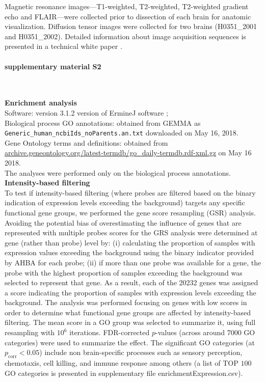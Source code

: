 \documentclass[10pt,A4]{article}
\begin{document}
Magnetic resonance images---T1-weighted, T2-weighted, T2-weighted gradient echo and FLAIR---were collected prior to dissection of each brain for anatomic visualization. Diffusion tensor images were collected for two brains (H0351\_2001 and H0351\_2002). Detailed information about image acquisition sequences is presented in a technical white paper \citep{AHBAdoc}.

\paragraph*{supplementary material S2}\mbox{}\\
\label{SItext2}

\textbf{Enrichment analysis} \\
\noindent Software: version 3.1.2 version of ErmineJ software \citep{Gillis2010};\\
Biological process GO annotations: obtained from GEMMA \citep{Zoubarev2012} as \\
\texttt{Generic\_human\_ncbiIds\_noParents.an.txt} downloaded on May 16, 2018. \\
Gene Ontology terms and definitions: obtained from \url{archive.geneontology.org/latest-termdb/go_daily-termdb.rdf-xml.gz} on May 16 2018.\\
The analyses were performed only on the biological process annotations. \\

\textbf{Intensity-based filtering}\\
To test if intensity-based filtering (where probes are filtered based on the binary indication of expression levels exceeding the background) targets any specific functional gene groups, we performed the gene score resampling (GSR) analysis. Avoiding the potential bias of overestimating the influence of genes that are represented with multiple probes scores for the GRS analysis were determined at gene (rather than probe) level by: (i) calculating the proportion of samples with expression values exceeding the background using the binary indicator provided by AHBA for each probe; (ii) if more than one probe was available for a gene, the probe with the highest proportion of samples exceeding the background was selected to represent that gene. As a result, each of the \num{20232} genes was assigned a score indicating the proportion of samples with expression levels exceeding the background. The analysis was performed focusing on genes with low scores in order to determine what functional gene groups are affected by intensity-based filtering. The mean score in a GO group was selected to summarize it, using full resampling with $10^{6}$ iterations. FDR-corrected $p$-values (across around \num{7000} GO categories) were used to summarize the effect. The significant GO categories (at $p_\mathrm{corr}<0.05$) include non brain-specific processes such as sensory perception, chemotaxis, cell killing, and immune response among others (a list of TOP $100$ GO categories is presented in supplementary file enrichmentExpression.csv). \\
\end{document}
